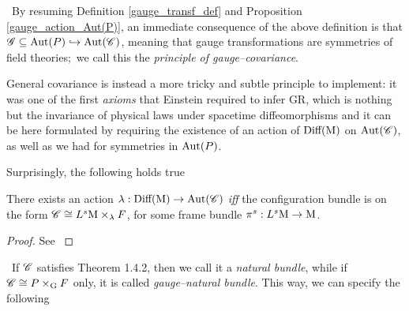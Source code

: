\,\newline
By resuming Definition \ref{gauge_transf_def} and Proposition \ref{gauge_action_Aut(P)}, an immediate consequence of the above definition is that $\mathscr{G}\subseteq\text{\normalfont Aut}(P)\hookrightarrow\text{\normalfont Aut}(\mathscr{C})$, meaning that gauge transformations are symmetries of field theories;\, we call this the \emph{principle of gauge--covariance}. 

General covariance is instead a more tricky and subtle principle to implement: it was one of the first \emph{axioms} that Einstein required to infer GR, which is nothing but the invariance of physical laws under spacetime diffeomorphisms and it can be here formulated by requiring the existence of an action of $\text{\normalfont Diff}(\text{\normalfont M})$ on $\text{\normalfont Aut}(\mathscr{C})$, as well as we had for symmetries in $\text{\normalfont Aut}(P)$.

Surprisingly, the following holds true

\begin{teo}
    There exists an action $\lambda:\text{\normalfont Diff}(\text{\normalfont M})\to\text{\normalfont Aut}(\mathscr{C})$ \emph{iff} the configuration bundle is on the form $\mathscr{C}\cong L^s\text{\normalfont M}\times_\lambda F$, for some frame bundle $\pi^s:L^s\text{\normalfont M}\to\text{\normalfont M}$.
\end{teo}
\begin{proof}
    See \cite{natural_operations}
\end{proof}
\,\newline
If $\mathscr{C}$ satisfies Theorem 1.4.2, then we call it a \emph{natural bundle}, while if $\mathscr{C}\cong P\times_{\text{\normalfont G}} F$ only, it is called \emph{gauge--natural bundle}. This way, we can specify the following


